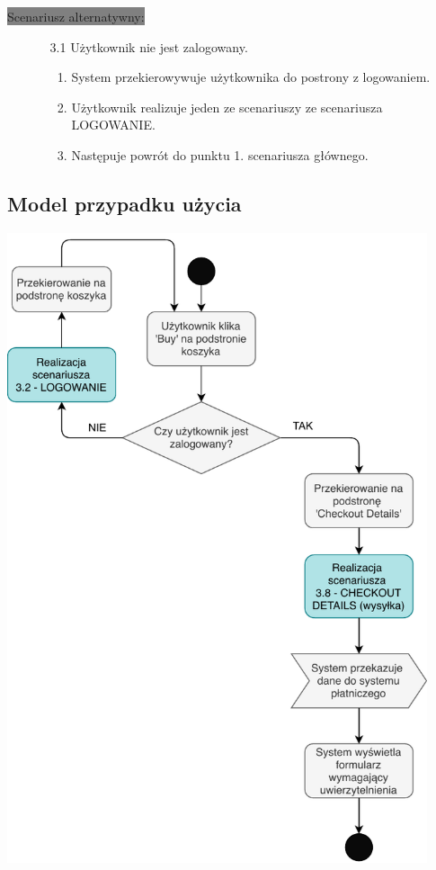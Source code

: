 \documentclass[10pt]{report}
\begin{document}
			\colorbox{grey}{Scenariusz alternatywny:}
			\begin{enumerate}\addtocounter{enumi}{6}
				\item[]
				\begin{enumerate}
					\item[3.1] Użytkownik nie jest zalogowany.
					\begin{enumerate}
						\item System przekierowywuje użytkownika do postrony z logowaniem.
						\item Użytkownik realizuje jeden ze scenariuszy ze scenariusza LOGOWANIE.
						\item Następuje powrót do punktu 1. scenariusza głównego.
					\end{enumerate}
				\end{enumerate}
			\end{enumerate}

		\subsection{Model przypadku użycia}
			\begin{center}
				\includegraphics[width=350pt]{zakup.pdf}
			\end{center}
\end{document}
